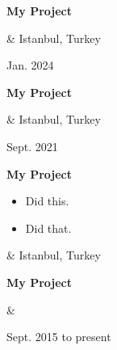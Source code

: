 \documentclass[10pt, letterpaper]{article}
\newenvironment{highlights}{
        \begin{itemize}[
                topsep=0pt,
                parsep=0.10 cm,
                partopsep=0pt,
                itemsep=0pt,
                after=\vspace{-1\baselineskip},
                leftmargin=0.4 cm + 3pt
            ]
    }{
        \end{itemize}
    } %
\let\originalTabularx\tabularx
\let\originalEndTabularx\endtabularx
\renewenvironment{tabularx}{\bgroup\centering\originalTabularx}{\originalEndTabularx\par\egroup}
\begin{document}
        \vspace{0.2 cm}
        \begin{tabularx}{
            \textwidth-0.4 cm-0.13cm
        }{
            K{0.2 cm}
            R{4.1 cm}
        }
            \textbf{My Project}

            \vspace{0.10 cm}

            &
            Istanbul, Turkey

            Jan. 2024
        \end{tabularx}


        \vspace{0.2 cm}
        \begin{tabularx}{
            \textwidth-0.4 cm-0.13cm
        }{
            K{0.2 cm}
            R{4.1 cm}
        }
            \textbf{My Project}

            \vspace{0.10 cm}

            &
            Istanbul, Turkey

            Sept. 2021
        \end{tabularx}


        \vspace{0.2 cm}
        \begin{tabularx}{
            \textwidth-0.4 cm-0.13cm
        }{
            K{0.2 cm}
            R{4.1 cm}
        }
            \textbf{My Project}

            \vspace{0.10 cm}

            \begin{highlights}
                \item Did this.
                \item Did that.
            \end{highlights}
            &
            Istanbul, Turkey

            
        \end{tabularx}


        \vspace{0.2 cm}
        \begin{tabularx}{
            \textwidth-0.4 cm-0.13cm
        }{
            K{0.2 cm}
            R{4.1 cm}
        }
            \textbf{My Project}

            \vspace{0.10 cm}

            &
            

            Sept. 2015 to present
        \end{tabularx}
\end{document}
